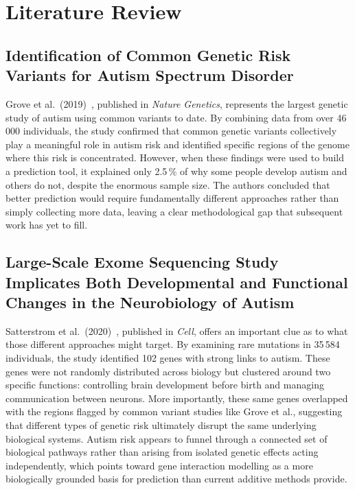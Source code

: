 \section{Literature Review}
\label{sec:litreview}

\subsection{Identification of Common Genetic Risk Variants for Autism Spectrum Disorder}

Grove et al.\ (2019)~\cite{grove2019}, published in \textit{Nature
Genetics}, represents the largest genetic study of autism using common
variants to date. By combining data from over 46\,000 individuals, the
study confirmed that common genetic variants collectively play a
meaningful role in autism risk and identified specific regions of the
genome where this risk is concentrated. However, when these findings
were used to build a prediction tool, it explained only 2.5\,\% of why
some people develop autism and others do not, despite the enormous
sample size. The authors concluded that better prediction would require
fundamentally different approaches rather than simply collecting more
data, leaving a clear methodological gap that subsequent work has yet
to fill.

\subsection{Large-Scale Exome Sequencing Study Implicates Both Developmental and Functional Changes in the Neurobiology of Autism}

Satterstrom et al.\ (2020)~\cite{satterstrom2020}, published in
\textit{Cell}, offers an important clue as to what those different
approaches might target. By examining rare mutations in 35\,584
individuals, the study identified 102 genes with strong links to
autism. These genes were not randomly distributed across biology but
clustered around two specific functions: controlling brain development
before birth and managing communication between neurons. More
importantly, these same genes overlapped with the regions flagged by
common variant studies like Grove et al., suggesting that different
types of genetic risk ultimately disrupt the same underlying
biological systems. Autism risk appears to funnel through a connected
set of biological pathways rather than arising from isolated genetic
effects acting independently, which points toward gene interaction
modelling as a more biologically grounded basis for prediction than
current additive methods provide.

